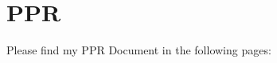 \chapter{PPR}
Please find my PPR Document in the following pages:


\newcommand{\draftstamp}{
    \begin{tikzpicture}[remember picture,overlay]
        \node[rotate=30,scale=12,text opacity=0.1] at (current page.center) {\textbf{DRAFT}};
    \end{tikzpicture}
}




% 